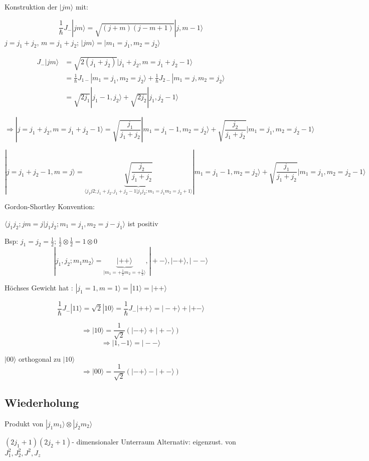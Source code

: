 Konstruktion der \(|jm\rangle\) mit:

\[ \frac 1 \hbar J_-|jm\rangle = \sqrt{(j+m)(j-m+1)}|j,m-1\rangle \]
\(j=j_1+j_2\), \(m=j_1+j_2\); \(|jm\rangle = | m_1=j_1,m_2=j_2\rangle\)

\begin{align} J_-|jm\rangle &=  \sqrt{2(j_1+j_2)}|j_1+j_2,m=j_1+j_2-1\rangle \\
&= \frac 1 \hbar J_{1-}|m_1=j_1,m_2=j_2\rangle + \frac 1 \hbar J_{2-}|m_1=j,m_2=j_2\rangle \\
&= \sqrt{2j_1}|j_1-1,j_2\rangle +   \sqrt{2j_2}|j_1,j_2-1\rangle
\end{align}


\[\Rightarrow | j=j_1+j_2, m=j_1+j_2-1\rangle = \sqrt{\frac {j_1}{j_1+j_2}}|m_1=j_1-1,m_2=j_2\rangle + \sqrt{\frac  {j_2}{j_1+j_2}}|m_1=j_1,m_2=j_2-1\rangle
\]


\[ |j=j_1+j_2-1,m=j\rangle = \underbrace{\sqrt{\frac{j_2}{j_1+j_2}}}_{\langle j_1j2;j_1+j_2,j_1+j_2-1|j_1j_2;m_1=j_1m_2=j_2+1\rangle}|m_1=j_1-1,m_2=j_2\rangle + \sqrt{\frac  {j_1}{j_1+j_2}}|m_1=j_1,m_2=j_2-1\rangle \]



Gordon-Shortley Konvention:

\(\langle j_1j_2;jm=j|j_1j_2;m_1=j_1,m_2=j-j_1\rangle\) ist positiv

Bsp: \(j_1=j_2=\frac 1 2\); \(\frac 1 2 \otimes \frac 1 2 = 1 \otimes 0\)
\[ |j_1,j_2;m_1m_2\rangle = \underbrace{|++\rangle}_{|m_1=+\frac 1 2 m_2=+\frac 1 2\rangle},|+-\rangle,|-+\rangle,|--\rangle\]


Höchses Gewicht hat : \(|j_1=1,m=1\rangle = |1 1\rangle=|++\rangle\) 

\[\frac 1 \hbar J_-|11\rangle=\sqrt 2 | 1 0\rangle=\frac 1 \hbar
J_-|++\rangle=|-+\rangle + |+-\rangle\]

\[ \Rightarrow |10\rangle = \frac 1 {\sqrt 2}(|-+\rangle + |+-\rangle) \]
\[ \Rightarrow |1,-1\rangle = |--\rangle \]

\(|00\rangle\) orthogonal zu \(|10\rangle\)
\[ \Rightarrow |00\rangle = \frac 1 {\sqrt 2}(|-+\rangle - |+-\rangle) \]



\subsection{Wiederholung}

Produkt von \(|j_1m_1\rangle\otimes|j_2m_2\rangle\)

\((2j_1+1)(2j_2+1)\)- dimensionaler Unterraum
Alternativ: eigenzust. von \(J^2_1,J^2_2,J^2,J_z\)

